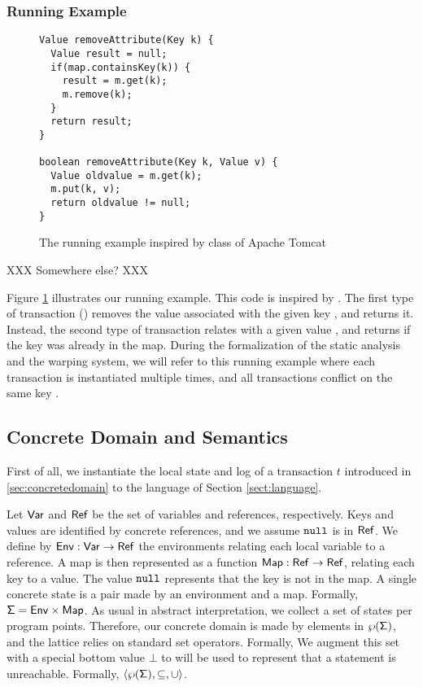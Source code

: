 \subsubsection{Running Example}

\begin{figure}
\begin{lstlisting}
Value removeAttribute(Key k) {
  Value result = null;
  if(map.containsKey(k)) {
    result = m.get(k);
    m.remove(k);
  }
  return result;
}
	
boolean removeAttribute(Key k, Value v) {
  Value oldvalue = m.get(k);
  m.put(k, v);
  return oldvalue != null;
}
\end{lstlisting}
\caption{The running example inspired by class  of Apache Tomcat}
\label{lst:runningexamplestaticanalysis}
\end{figure}

XXX Somewhere else? XXX

Figure \ref{lst:runningexamplestaticanalysis} illustrates our running example. This code is inspired by . The first type of transaction () removes the value associated with the given key , and returns it. Instead, the second type of transaction relates  with a given value , and returns  if the key was already in the map. During the formalization of the static analysis and the warping system, we will refer to this running example where each transaction is instantiated multiple times, and all transactions conflict on the same key .


\subsection{Concrete Domain and Semantics}
First of all, we instantiate the local state and log of a transaction $t$ introduced in \ref{sec:concretedomain} to the language of Section \ref{sect:language}.

Let $\mathsf{Var}$ and $\mathsf{Ref}$ be the set of variables and references, respectively. Keys and values are identified by concrete references, and we assume $\mathtt{null}$ is in $\mathsf{Ref}$. We define by $\mathsf{Env} : \mathsf{Var} \to \mathsf{Ref}$ the environments relating each local variable to a reference. A map is then represented as a function $\mathsf{Map} : \mathsf{Ref} \to \mathsf{Ref}$, relating each key to a value. The value $\mathtt{null}$ represents that the key is not in the map. A single concrete state is a pair made by an environment and a map. Formally, $\mathsf{\Sigma} = \mathsf{Env} \times \mathsf{Map}$. As usual in abstract interpretation, we collect a set of states per program points. Therefore, our concrete domain is made by elements in $\wp(\mathsf{\Sigma})$, and the lattice relies on standard set operators. Formally, We augment this set with a special bottom value $\bot$ to will be used to represent that a statement is unreachable. Formally, $\langle \wp(\mathsf{\Sigma}), \subseteq, \cup \rangle$.

